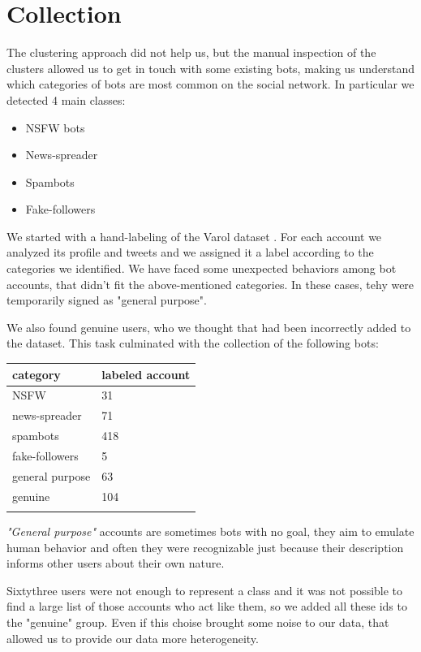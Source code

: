 \section{Collection}

The clustering approach did not help us, but the manual inspection of the clusters allowed us to get in touch with some existing bots, making us understand which categories of bots are most common on the social network. In particular we detected 4 main classes:
\begin{itemize}
	\item[\PencilRight]NSFW bots
	\item[\PencilRight]News-spreader
	\item[\PencilRight]Spambots
	\item[\PencilRight]Fake-followers
\end{itemize}

We started with a hand-labeling of the Varol dataset \cite{Varol}. For each account we analyzed its profile and tweets and we assigned it a label according to the categories we identified.  We have faced some unexpected behaviors among bot accounts, that didn't fit the above-mentioned categories. In these cases, tehy were temporarily signed as "general purpose".

We also found genuine users, who we thought that had been incorrectly added to the dataset.
This task culminated with the collection of the following bots:

\begin{center}
	\begin{tabular}{ll}
		\\category&labeled account\\
		\hline\hline
		NSFW&31\\
		news-spreader&71\\
		spambots&418\\
		fake-followers&5\\
		general purpose&63\\
		genuine&104\\\hline\\		
	\end{tabular}
\end{center}

\emph{"General purpose"} accounts are sometimes bots with no goal, they aim to emulate human behavior and often they were recognizable just because their description informs other users about their own nature.

Sixtythree users were not enough to represent a class and it was not possible to find a large list of those accounts who act like them, so we added all these ids to the "genuine" group. Even if this choise brought some noise to our data, that allowed us to provide our data more heterogeneity.

